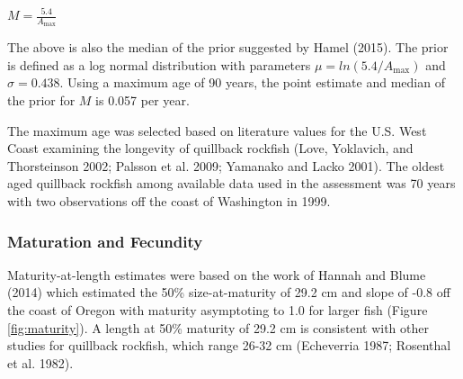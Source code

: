 \documentclass[11pt,
  english,
  a4paper,
]{article}
\begin{document}
\leavevmode\tagmcend\tagstructend\par

\begin{centering}

$M=\frac{5.4}{A_{\text{max}}}$

\end{centering}


The above is also the median of the prior suggested by Hamel {(2015)\leavevmode\tagmcend\tagstructend}. The prior is defined as a log normal distribution with parameters {\(\mu = ln(5.4/A_{\text{max}})\)\leavevmode\tagmcend\tagstructend} and {\(\sigma = 0.438\)\leavevmode\tagmcend\tagstructend}. Using a maximum age of 90 years, the point estimate and median of the prior for {\(M\)\leavevmode\tagmcend\tagstructend} is 0.057 per year.

\leavevmode\tagmcend\tagstructend\par


The maximum age was selected based on literature values for the U.S. West Coast examining the longevity of quillback rockfish {(Love, Yoklavich, and Thorsteinson 2002; Palsson et al. 2009; Yamanako and Lacko 2001)\leavevmode\tagmcend\tagstructend}. The oldest aged quillback rockfish among available data used in the assessment was 70 years with two observations off the coast of Washington in 1999.

\leavevmode\tagmcend\tagstructend\par


\hypertarget{maturation-and-fecundity}{%
\subsubsection{Maturation and Fecundity}\label{maturation-and-fecundity}}

\leavevmode\tagmcend\tagstructend


Maturity-at-length estimates were based on the work of Hannah and Blume {(2014)\leavevmode\tagmcend\tagstructend} which estimated the 50\% size-at-maturity of 29.2 cm and slope of -0.8 off the coast of Oregon with maturity asymptoting to 1.0 for larger fish (Figure \ref{fig:maturity}). A length at 50\% maturity of 29.2 cm is consistent with other studies for quillback rockfish, which range 26-32 cm {(Echeverria 1987; Rosenthal et al. 1982)\leavevmode\tagmcend\tagstructend}.
\end{document}
